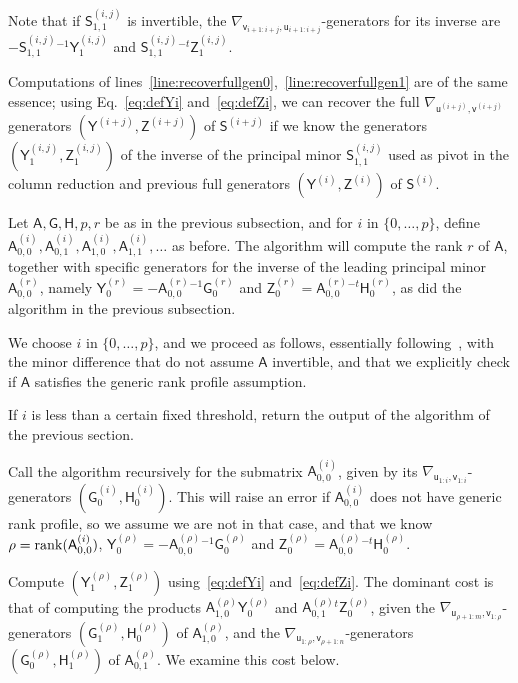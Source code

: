\documentclass{sig-alternate}
\newcommand{\vu}{\ensuremath{\mathsf{u}}}
\newcommand{\vv}{\ensuremath{\mathsf{v}}}
\newcommand{\mA}{\ensuremath{\mathsf{A}}}
\newcommand{\mG}{\ensuremath{\mathsf{G}}}
\newcommand{\mH}{\ensuremath{\mathsf{H}}}
\newcommand{\mS}{\ensuremath{\mathsf{S}}}
\newcommand{\mY}{\ensuremath{\mathsf{Y}}}
\newcommand{\mZ}{\ensuremath{\mathsf{Z}}}
\begin{document}
Note that if $\mS^{(i,j)}_{1,1}$ is invertible, the
$\nabla_{\vv_{i+1:i+j},\vu_{i+1:i+j}}$-generators for its
inverse are
$-\mS^{(i,j)}_{1,1}{}^{-1} \mY^{(i,j)}_1$ and
$\mS^{(i,j)}_{1,1}{}^{-t} \mZ^{(i,j)}_1$.  

Computations of
lines~\ref{line:recoverfullgen0},~\ref{line:recoverfullgen1} are of
the same essence; using Eq.~\eqref{eq:defYi} and~\eqref{eq:defZi}, we
can recover the full $\nabla_{\vu^{(i+j)},\vv^{(i+j)}}$ generators
$(\mY^{(i+j)},\mZ^{(i+j)})$ of $\mS^{(i+j)}$ if we know the generators
$(\mY^{(i,j)}_1,\mZ^{(i,j)}_1)$ of the inverse of the principal minor
$\mS^{(i,j)}_{1,1}$ used as pivot in the column reduction and previous
full generators $(\mY^{(i)},\mZ^{(i)})$ of $\mS^{(i)}$.



\bigskip


Let $\mA,\mG,\mH,p,r$ be as in the previous subsection, and for $i$ in
$\{0,\dots,p\}$, define
${\mA^{(i)}_{0,0}},\mA^{(i)}_{0,1},\mA^{(i)}_{1,0},\mA^{(i)}_{1,1},\dots$ as before.
The algorithm will compute the rank $r$ of $\mA$, together with
specific generators for the inverse of the leading principal minor
$\mA^{(r)}_{0,0}$, namely $\mY^{(r)}_0=-\mA^{(r)}_{0,0}{}^{-1} \mG^{(r)}_0$ and
  $\mZ^{(r)}_0=\mA^{(r)}_{0,0}{}^{-t}\mH^{(r)}_0$, as did the algorithm in the
  previous subsection.

We choose $i$ in $\{0,\dots,p\}$, and we proceed as follows,
essentially following~\cite{JeMo10}, with the minor difference that do
not assume $\mA$ invertible, and that we explicitly check if $\mA$
satisfies the generic rank profile assumption.

\smallskip{} If $i$ is less than a certain fixed threshold, return the
output of the algorithm of the previous section.

\smallskip{} Call the algorithm recursively for the
submatrix ${\mA^{(i)}_{0,0}}$, given by its
$\nabla_{\vu_{1:i},\vv_{1:i}}$-generators
$(\mG^{(i)}_0,\mH^{(i)}_0)$. This will raise an error if
${\mA^{(i)}_{0,0}}$ does not have generic rank profile, so we assume
we are not in that case, and that we know $\rho={\rm
  rank}({\mA^{(i)}_{0,0}})$, $\mY^{(\rho)}_0=-\mA^{(\rho)}_{0,0}{}^{-1}
\mG^{(\rho)}_0$ and $\mZ^{(\rho)}_0=\mA^{(\rho)}_{0,0}{}^{-t}\mH^{(\rho)}_0$.

\smallskip{} Compute $(\mY^{(\rho)}_1,\mZ^{(\rho)}_1)$
using~\eqref{eq:defYi} and~\eqref{eq:defZi}. The dominant cost is that
of computing the products $\mA^{(\rho)}_{1,0} \mY^{(\rho)}_0$ and
$\mA^{(\rho)}_{0,1}{}^t \mZ^{(\rho)}_0$, given the
$\nabla_{\vu_{\rho+1:m},\vv_{1:\rho}}$-generators
$(\mG^{(\rho)}_1,\mH^{(\rho)}_0)$ of $\mA^{(\rho)}_{1,0}$, and the
$\nabla_{\vu_{1:\rho},\vv_{\rho+1:n}}$-generators
$(\mG^{(\rho)}_0,\mH^{(\rho)}_1)$ of $\mA^{(\rho)}_{0,1}$.  We examine this cost
below.
\end{document}
